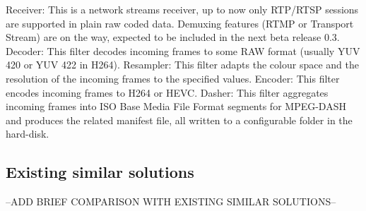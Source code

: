 Receiver: This is a network streams receiver, up to now only RTP/RTSP sessions are supported in plain raw coded data. Demuxing features (RTMP or Transport Stream) are on the way, expected to be included in the next beta release 0.3.
Decoder: This filter decodes incoming frames to some RAW format (usually YUV 420 or YUV 422 in H264).
Resampler: This filter adapts the colour space and the resolution of the incoming frames to the specified values.
Encoder: This filter encodes incoming frames to H264 or HEVC.
Dasher: This filter aggregates incoming frames into ISO Base Media File Format segments for MPEG-DASH and produces the related manifest file, all written to a configurable folder in the hard-disk.


\subsection{Existing similar solutions}\label{SOA:similarSolutions}


--ADD BRIEF COMPARISON WITH EXISTING SIMILAR SOLUTIONS--


